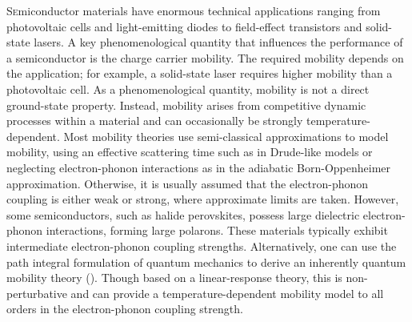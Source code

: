 \lettrine{S}emiconductor materials have enormous technical applications ranging from photovoltaic cells and light-emitting diodes to field-effect transistors and solid-state lasers. A key phenomenological quantity that influences the performance of a semiconductor is the charge carrier mobility. The required mobility depends on the application; for example, a solid-state laser requires higher mobility than a photovoltaic cell. As a phenomenological quantity, mobility is not a direct ground-state property. Instead, mobility arises from competitive dynamic processes within a material and can occasionally be strongly temperature-dependent. Most mobility theories use semi-classical approximations to model mobility, using an effective scattering time such as in Drude-like models or neglecting electron-phonon interactions as in the adiabatic Born-Oppenheimer approximation. Otherwise, it is usually assumed that the electron-phonon coupling is either weak or strong, where approximate limits are taken. However, some semiconductors, such as halide perovskites, possess large dielectric electron-phonon interactions, forming large polarons. These materials typically exhibit intermediate electron-phonon coupling strengths. Alternatively, one can use the path integral formulation of quantum mechanics to derive an inherently quantum mobility theory (\cite{feynman_slow_1955, feynman_mobility_1962}). Though based on a linear-response theory, this is non-perturbative and can provide a temperature-dependent mobility model to all orders in the electron-phonon coupling strength.
